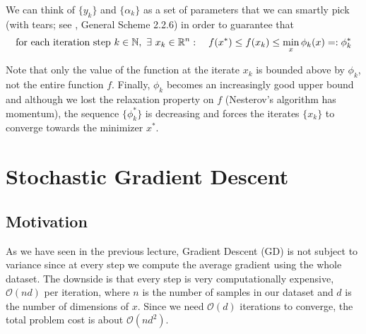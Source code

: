 \documentclass{article}
\begin{document}
We can think of $\{y_k\}$ and $\{\alpha_k\}$ as a set of parameters that we can smartly pick (with tears; see \cite{Nesterov1998}, General Scheme 2.2.6) in order to guarantee that 
\begin{gather}
\text{for each iteration step } k \in \mathbb{N}, \ \exists \ x_k \in \mathbb{R}^n: \quad f(x^\ast) \leq f(x_k) \leq  \min\limits_{x} \phi_k (x) =: \phi_k^\ast\label{eq11}
\end{gather}

Note that only the value of the function at the iterate $x_k$ is bounded above by $\phi_k$, not the entire function $f$. 
Finally, $\phi_k$ becomes an increasingly good upper bound and although we lost the relaxation property on $f$ (Nesterov's algorithm has momentum), the sequence $\{\phi_k^\ast\}$ is decreasing and forces the iterates $\{x_k\}$ to converge towards the minimizer $x^\ast$.





\section{Stochastic Gradient Descent}

\subsection{Motivation}

As we have seen in the previous lecture, Gradient Descent (GD) is not subject to variance since at every step we compute the average gradient using the whole dataset. The downside is that every step is very computationally expensive, $\mathcal O(nd)$ per iteration, where $n$ is the number of samples in our dataset and $d$ is the number of dimensions of $x$. Since we need $\mathcal O(d)$ iterations to converge, the total problem cost is about $\mathcal O(nd^2)$.\\
\end{document}
